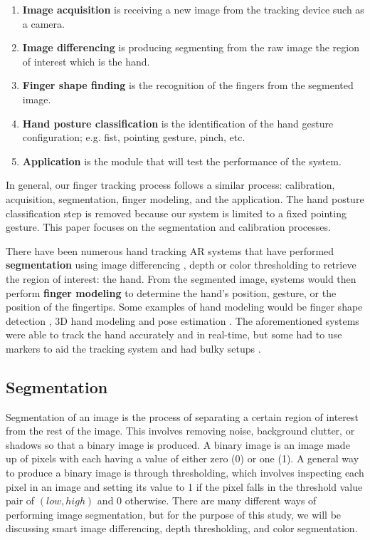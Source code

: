 \documentclass{acm_proc_article-sp}
\begin{document}
\begin{enumerate}
	\item \textbf{Image acquisition} is receiving a new image from the tracking device such as a camera.
	\item \textbf{Image differencing} is producing segmenting from the raw image the region of interest which is the hand.
	\item \textbf{Finger shape finding} is the recognition of the fingers from the segmented image. 
	\item \textbf{Hand posture classification} is the identification of the hand gesture configuration; e.g. fist, pointing gesture, pinch, etc.
	\item \textbf{Application} is the module that will test the performance of the system.
\end{enumerate}

In general, our finger tracking process follows a similar process: calibration, acquisition, segmentation, finger modeling, and the application. The hand posture classification step is removed because our system is limited to a fixed pointing gesture. This paper focuses on the segmentation and calibration processes.

There have been numerous hand tracking AR systems that have performed \textbf{segmentation} using image differencing \cite{Hardenberg:2001, Song:2008}, depth \cite{Kulshreshth:2013, Raheja:2011} or color thresholding \cite{Byron:2009, Gumpp:2006} to retrieve the region of interest: the hand. From the segmented image, systems would then perform \textbf{finger modeling} to determine the hand's position, gesture, or the position of the fingertips. Some examples of hand modeling would be finger shape detection \cite{Song:2008,Hardenberg:2001}, 3D hand modeling \cite{Byron:2009, Gumpp:2006} and pose estimation \cite{SchlattmannKahlesz:2007, Wang:2011}. The aforementioned systems were able to track the hand accurately and in real-time, but some had to use markers to aid the tracking system \cite{Chun:2013, Refinger:2007, Huynh:2009} and had bulky setups \cite{SchlattmannKahlesz:2007, Wang:2011}.


\subsection{Segmentation}

Segmentation of an image is the process of separating a certain region of interest from the rest of the image. This involves removing noise, background clutter, or shadows so that a binary image is produced. A binary image is an image made up of pixels with each having a value of either zero (0) or one (1). A general way to produce a binary image is through thresholding, which involves inspecting each pixel in an image and setting its value to 1 if the pixel falls in the threshold value pair of \( (low, high) \) and 0 otherwise. There are many different ways of performing image segmentation, but for the purpose of this study, we will be discussing smart image differencing, depth thresholding, and color segmentation.
\end{document}
